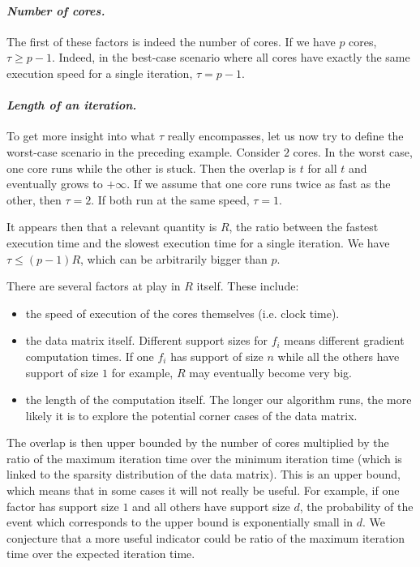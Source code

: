 \documentclass[twoside, 11pt]{article}
\newcommand{\overlap}{\tau}
\begin{document}
\paragraph{\textit{Number of cores.}}
The first of these factors is indeed the number of cores.
If we have $p$ cores, $\overlap \geq p - 1$.
Indeed, in the best-case scenario where all cores have exactly the same execution speed for a single iteration, $\overlap = p -1$.

\paragraph{\textit{Length of an iteration.}}
To get more insight into what $\overlap$ really encompasses, let us now try to define the worst-case scenario in the preceding example.
Consider $2$ cores.
In the worst case, one core runs while the other is stuck.
Then the overlap is $t$ for all $t$ and eventually grows to $+\infty$.
If we assume that one core runs twice as fast as the other, then $\overlap = 2$.
If both run at the same speed, $\overlap = 1$.

It appears then that a relevant quantity is $R$, the ratio between the fastest execution time and the slowest execution time for a single iteration.
We have $\overlap \leq (p-1) R$, which can be arbitrarily bigger than $p$.


There are several factors at play in $R$ itself. These include:
\begin{itemize}
	\item the speed of execution of the cores themselves (i.e. clock time).

	\item the data matrix itself. Different support sizes for $f_i$ means different gradient computation times. If one $f_i$ has support of size $n$ while all the others have support of size $1$ for example, $R$ may eventually become very big.

	\item the length of the computation itself. The longer our algorithm runs, the more likely it is to explore the potential corner cases of the data matrix.
\end{itemize}

The overlap is then upper bounded by the number of cores multiplied by the ratio of the maximum iteration time over the minimum iteration time (which is linked to the sparsity distribution of the data matrix).
This is an upper bound, which means that in some cases it will not really be useful.
For example, if one factor has support size $1$ and all others have support size $d$, the probability of the event which corresponds to the upper bound is exponentially small in $d$.
We conjecture that a more useful indicator could be ratio of the maximum iteration time over the expected iteration time.
\end{document}
